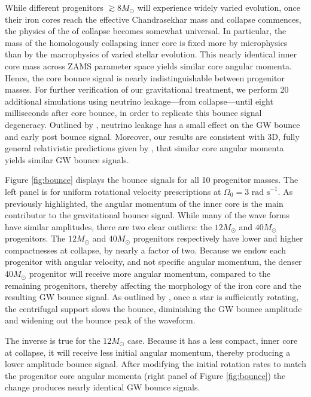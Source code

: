 \documentclass[twocolumn,times]{aastex62}  %
\begin{document}
While different progenitors $\gtrsim 8 M_\odot$ will experience widely varied evolution, once their iron cores reach the effective Chandrasekhar mass \citep{baron:1990} and collapse commences, the physics of the of collapse becomes somewhat universal.
In particular, the mass of the homologously collapsing inner core is fixed more by microphysics than by the macrophysics of varied stellar evolution. 
This nearly identical inner core mass across ZAMS parameter space yields similar core angular momenta.  Hence, the core bounce signal is nearly indistinguishable between progenitor masses.  For further verification of our gravitational treatment, we perform 20 additional simulations using neutrino leakage---from collapse---until eight milliseconds after core bounce, in order to replicate this bounce signal degeneracy.  Outlined by \citet{ott:2012}, neutrino leakage has a small effect on the GW bounce and early post bounce signal.  
Moreover, our results are consistent with 3D, fully general relativistic predictions given by \citet{ott:2012}, that similar core angular momenta yields similar GW bounce signals.  

Figure \ref{fig:bounce} displays the bounce signals for all 10 progenitor masses.  The left panel is for uniform rotational velocity prescriptions at $\Omega_0 = 3\text{ rad s}^{-1}$.  As previously highlighted, the angular momentum of the inner core is the main contributor to the gravitational bounce signal.  While many of the wave forms have similar amplitudes, there are two clear outliers: the $12 M_\odot$ and $40 M_\odot$ progenitors.  The $12 M_\odot$ and $40 M_\odot$ progenitors respectively have lower and higher compactnesses at collapse, by nearly a factor of two.  Because we endow each progenitor with angular velocity, and not specific angular momentum, the denser $40 M_\odot$ progenitor will receive more angular momentum, compared to the remaining progenitors, thereby affecting the morphology of the iron core and the resulting GW bounce signal.  As outlined by \citet{dimm:2008}, once a star is sufficiently rotating, the centrifugal support slows the bounce, diminishing the GW bounce amplitude and widening out the bounce peak of the waveform.  

The inverse is true for the $12 M_\odot$ case.  Because it has a less compact, inner core at collapse, it will receive less initial angular momentum, thereby producing a lower amplitude bounce signal.  After modifying the initial rotation rates to match the progenitor core angular momenta (right panel of Figure \ref{fig:bounce}) the change produces nearly identical GW bounce signals.  
\end{document}
